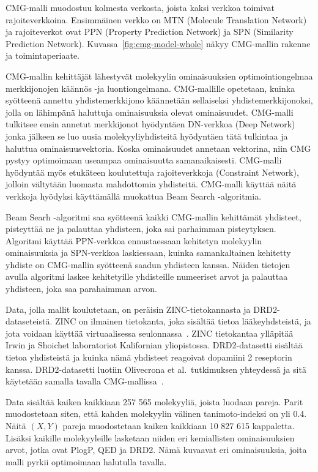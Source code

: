 \documentclass[finnish,twoside,censored,tkt,sw-line]{HYthesisML}
\begin{document}
CMG-malli muodostuu kolmesta verkosta, joista kaksi verkkoa toimivat rajoiteverkkoina.
Ensimmäinen verkko on MTN (Molecule Translation Network) ja rajoiteverkot ovat PPN (Property Prediction Network) ja SPN (Similarity Prediction Network).
Kuvassa~\ref{fig:cmg-model-whole} näkyy CMG-mallin rakenne ja toimintaperiaate.

CMG-mallin kehittäjät lähestyvät molekyylin ominaisuuksien optimointiongelmaa merkkijonojen käännös -ja luontiongelmana.
CMG-mallille opetetaan, kuinka syötteenä annettu yhdistemerkkijono käännetään sellaiseksi yhdistemerkkijonoksi, jolla on lähimpänä haluttuja ominaisuuksia olevat ominaisuudet.
CMG-malli tulkitsee ensin annetut merkkijonot hyödyntäen DN-verkkoa (Deep Network) jonka jälkeen se luo uusia molekyyliyhdisteitä hyödyntäen tätä tulkintaa ja haluttua ominaisuusvektoria.
Koska ominaisuudet annetaan vektorina, niin CMG pystyy optimoimaan useampaa ominaisuutta samanaikaisesti.
CMG-malli hyödyntää myös etukäteen koulutettuja rajoiteverkkoja (Constraint Network), jolloin vältytään luomasta mahdottomia yhdisteitä.
CMG-malli käyttää näitä verkkoja hyödyksi käyttämällä muokattua Beam Search -algoritmia.

Beam Searh -algoritmi saa syötteenä kaikki CMG-mallin kehittämät yhdisteet, pisteyttää ne ja palauttaa yhdisteen, joka sai parhaimman pisteytyksen.
Algoritmi käyttää PPN-verkkoa ennustaessaan kehitetyn molekyylin ominaisuuksia ja SPN-verkkoa laskiessaan, kuinka samankaltainen kehitetty yhdiste on CMG-mallin syötteenä saadun yhdisteen kanssa.
Näiden tietojen avulla algoritmi laskee kehitetyille yhdisteille numeeriset arvot ja palauttaa yhdisteen, joka saa parahaimman arvon.

Data, jolla mallit koulutetaan, on peräisin ZINC-tietokannasta ja DRD2-dataseteistä.
ZINC on ilmainen tietokanta, joka sisältää tietoa lääkeyhdsteistä, ja jota voidaan käyttää virtuaalisessa seulonnassa~\cite{ZINC}.
ZINC tietokantaa ylläpitää Irwin ja Shoichet laboratoriot Kalifornian yliopistossa.
DRD2-datasetti sisältää tietoa yhdisteistä ja kuinka nämä yhdisteet reagoivat dopamiini 2 reseptorin kanssa.
DRD2-datasetti luotiin Olivecrona et al.\ tutkimuksen yhteydessä ja sitä käytetään samalla tavalla CMG-mallissa~\cite{ShinBonggun}.

Data sisältää kaiken kaikkiaan 257 565 molekyyliä, joista luodaan pareja.
Parit muodostetaan siten, että kahden molekyylin välinen tanimoto-indeksi on yli 0.4.
Näitä \((X,Y)\) pareja muodostetaan kaiken kaikkiaan 10 827 615 kappaletta.
Lisäksi kaikille molekyyleille lasketaan niiden eri kemiallisten ominaisuuksien arvot, jotka ovat PlogP, QED ja DRD2.
Nämä kuvaavat eri ominaisuuksia, joita malli pyrkii optimoimaan halutulla tavalla.
\end{document}
